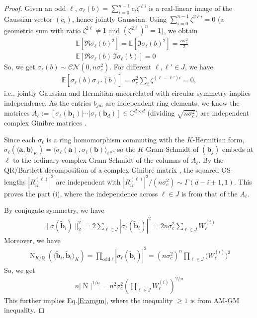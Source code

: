\documentclass[11pt,a4paper]{article}
\theoremstyle{plain}
\theoremstyle{definition}
\theoremstyle{remark}
\DeclareMathOperator{\Nm}{N}
\newcommand{\Q}{\mathbb{Q}}
\newcommand{\C}{\mathbb{C}}
\newcommand{\E}{\mathbb{E}}
\begin{document}
\begin{proof}
Given an odd $\ell$, $\sigma_\ell(b)=\sum_{i=0}^{n-1}c_i\zeta^{\ell i}$ is a real-linear image of the Gaussian vector $(c_i)$, hence jointly Gaussian. Using $\sum_{i=0}^{n-1}\zeta^{2\ell i}=0$ (a geometric sum with ratio $\zeta^{2\ell}\ne1$ and $(\zeta^{2\ell})^{n}=1$), we obtain 
\begin{align}    
 &\E[\Re\sigma_\ell(b)^2]=\E[\Im\sigma_\ell(b)^2]=\tfrac{n\sigma_c^2}{2}
\\ 
 &\E[\Re\sigma_\ell(b)\,\Im\sigma_\ell(b)]=0
\end{align}
So, we get $\sigma_\ell(b)\sim\mathcal{CN}(0,n\sigma_c^2)$. For different $\ell, \ell'\in J$, we have 
\begin{align}   
 \E[\sigma_\ell(b)\overline{\sigma_{\ell'}(b)}] =\sigma_c^2\sum_i\zeta^{(\ell-\ell')i}=0,
  \label{E:exporth}
\end{align}
i.e., jointly Gaussian and Hermitian-uncorrelated with circular symmetry implies independence. As the entries $b_{jm}$ are independent ring elements, we know the matrices $A_\ell:=[\sigma_\ell(\mathbf{b}_1)| \cdots| \sigma_\ell(\mathbf{b}_d)] \in\C^{d\times d}$ (dividing $\sqrt{n\sigma_c^2}$) are independent complex Ginibre matrices \cite{Muirhead82,Forrester10}.

Since each $\sigma_\ell$ is a ring homomorphism commuting with the $K$-Hermitian form, $\sigma_\ell(\langle\mathbf{a}, \mathbf{b}\rangle_K)=\langle\sigma_\ell(\mathbf{a}), \sigma_\ell(\mathbf{b})\rangle_{\C^d}$, so the $K$-Gram-Schmidt of $(\mathbf{b}_j)$ embeds at $\ell$ to the ordinary complex Gram-Schmidt of the columns of $A_\ell$. By the QR/Bartlett decomposition of a complex Ginibre matrix \cite{Goodman63,Edelman89}, the squared GS-lengths $|R^{(\ell)}_{ii}|^2$ are independent with $|R^{(\ell)}_{ii}|^2/(n\sigma_c^2)\sim\Gamma(d-i+1,1)$. This proves the part (i), where the independence across $\ell\in J$ is from that of the $A_\ell$.

By conjugate symmetry, we have 
\begin{align}
\|\sigma(\tilde{\mathbf{b}}_i)\|_2^2
=2\sum_{\ell\in J}|\sigma_\ell(\tilde{\mathbf{b}}_i)|^2
=2n\sigma_c^2\sum_{\ell\in J}W^{(i)}_\ell
\end{align}
Moreover, we have 
\begin{align}
\Nm_{K/\Q}(\langle\tilde{\mathbf{b}}_i,\tilde{\mathbf{b}}_i\rangle_K)
=\prod_{\text{odd}\ \ell}|\sigma_\ell(\tilde{\mathbf{b}}_i)|^2
=(n\sigma_c^2)^n\prod_{\ell\in J}\bigl(W^{(i)}_\ell\bigr)^2    
\end{align}
So, we get
\begin{align}
n|\Nm|^{1/n}=n^2\sigma_c^2(\prod_{\ell\in J}W^{(i)}_\ell)^{2/n}
\end{align}
This further implies Eq.\eqref{E:amgm}, where the inequality $\ge 1$ is from AM-GM inequality.


\end{proof}
\end{document}
